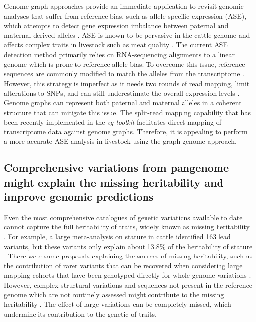 \documentclass[../main.tex]{subfiles}
\begin{document}
Genome graph approaches provide an immediate application to revisit genomic analyses that suffer from reference bias, such as allele-specific expression (ASE), which attempts to detect gene expression imbalance between paternal and maternal-derived alleles \citep{castel2020vast}. ASE is known to be pervasive in the cattle genome \citep{chamberlain2015extensive} and affects complex traits in livestock such as meat quality \citep{guillocheau2019survey,bruscadin2021muscle}. The current ASE detection method primarily relies on RNA-sequencing alignments to a linear genome which is prone to reference allele bias. To overcome this issue, reference sequences are commonly modified to match the alleles from the transcriptome \citep{salavati2019elimination}. However, this strategy is imperfect as it needs two rounds of read mapping, limit alterations to SNPs, and can still underestimate the overall expression levels \citep{van2015wasp}. Genome graphs can represent both paternal and maternal alleles in a coherent structure that can mitigate this issue. The split-read mapping capability that has been recently implemented in the \emph{vg toolkit} \citep{Sibbesen2021} facilitates direct mapping of transcriptome data against genome graphs. Therefore, it is appealing to perform a more accurate ASE analysis in livestock using the graph genome approach. 

\subsection*{Comprehensive variations from pangenome might explain the missing heritability and improve genomic predictions}

Even the most comprehensive catalogues of genetic variations available to date cannot capture the full heritability of traits, widely known as missing heritability \citep{maher2008personal}. For example, a large meta-analysis on stature in cattle identified 163 lead variants, but these variants only explain about 13.8\% of the heritability of stature \citep{bouwman2018meta}. There were some proposals explaining the sources of missing heritability, such as the contribution of rarer variants \citep{gonzalez2015rare} that can be recovered when considering large mapping cohorts that have been genotyped directly for whole-genome variations \citep{wainschtein2019recovery}. However, complex structural variations and sequences not present in the reference genome which are not routinely assessed might contribute to the missing heritability \citep{genin2020missing,theunissen2020structural}. The effect of large variations can be completely missed, which undermine its contribution to the genetic of traits. 
\end{document}
